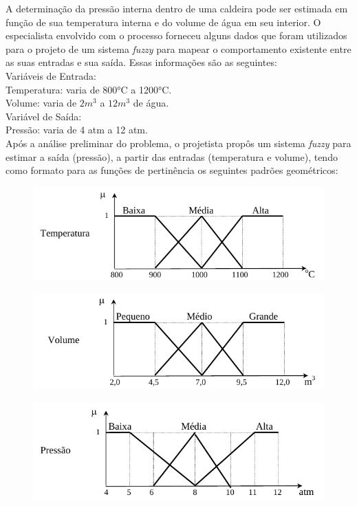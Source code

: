 \documentclass{report}
\begin{document}
\newpage

A determinação da pressão interna dentro de uma caldeira pode ser estimada em função
de sua temperatura interna e do volume de água em seu interior. O especialista envolvido com o
processo forneceu alguns dados que foram utilizados para o projeto de um sistema \emph{fuzzy} para
mapear o comportamento existente entre as suas entradas e sua saída. Essas informações são as
seguintes:\\

Variáveis de Entrada:\\
Temperatura: varia de 800°C a 1200°C.\\
Volume: varia de $2m^3$ a $12m^3$ de água.\\

Variável de Saída:\\
Pressão: varia de 4 atm a 12 atm.\\

Após a análise preliminar do problema, o projetista propôs um sistema \emph{fuzzy} para
estimar a saída (pressão), a partir das entradas (temperatura e volume), tendo como formato para
as funções de pertinência os seguintes padrões geométricos:

\begin{figure}[hptb]
\centering
\includegraphics[scale=.8]{g1.png}
\end{figure}

\begin{figure}[hptb]
\centering
\includegraphics[scale=.8]{g2.png}
\end{figure}

\begin{figure}[hptb]
\centering
\includegraphics[scale=.8]{g3.png}
\end{figure}
\end{document}
